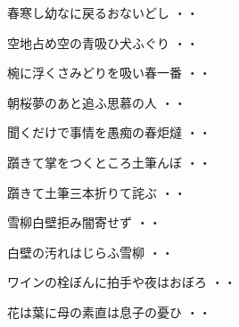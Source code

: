 \begin{shiika}春寒し幼なに戻るおないどし
\hfill{・・}\end{shiika}
\vspace{0.6cm}
\begin{shiika}空地占め空の青吸ひ犬ふぐり
\hfill{・・}\end{shiika}
\vspace{0.6cm}
\begin{shiika}椀に浮くさみどりを吸い春一番
\hfill{・・}\end{shiika}
\vspace{0.6cm}
\begin{shiika}朝桜夢のあと追ふ思慕の人
\hfill{・・}\end{shiika}
\vspace{0.6cm}
\begin{shiika}聞くだけで事情を愚痴の春炬燵
\hfill{・・}\end{shiika}
\vspace{0.6cm}
\begin{shiika}躓きて掌をつくところ土筆んぼ
\hfill{・・}\end{shiika}
\vspace{0.6cm}
\begin{shiika}躓きて土筆三本折りて詫ぶ
\hfill{・・}\end{shiika}
\vspace{0.6cm}
\begin{shiika}雪柳白壁拒み闇寄せず
\hfill{・・}\end{shiika}
\vspace{0.6cm}
\begin{shiika}白壁の汚れはじらふ雪柳
\hfill{・・}\end{shiika}
\vspace{0.6cm}
\begin{shiika}ワインの栓ぼんに拍手や夜はおぼろ
\hfill{・・}\end{shiika}
\vspace{0.6cm}
\begin{shiika}花は葉に母の素直は息子の憂ひ
\hfill{・・}\end{shiika}
\vspace{0.6cm}
